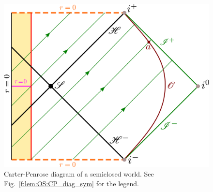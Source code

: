 \begin{figure}
\centerline{\includegraphics[height=0.35\textheight]{lem_OS_CP_diag_sclosed.pdf}}
\caption[]{\label{f:lem:OS:CP_diag_sclosed} \footnotesize
Carter-Penrose diagram of a semiclosed world. See Fig.~\ref{f:lem:OS:CP_diag_sym}
for the legend.
}
\end{figure}

